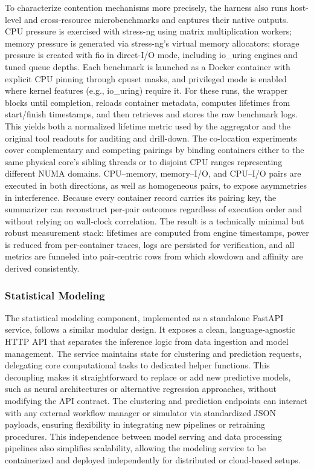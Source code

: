 To characterize contention mechanisms more precisely, the harness also runs host-level and cross-resource microbenchmarks and captures their native outputs. CPU pressure is exercised with stress-ng using matrix multiplication workers; memory pressure is generated via stress-ng’s virtual memory allocators; storage pressure is created with fio in direct-I/O mode, including io_uring engines and tuned queue depths. Each benchmark is launched as a Docker container with explicit CPU pinning through cpuset masks, and privileged mode is enabled where kernel features (e.g., io_uring) require it. For these runs, the wrapper blocks until completion, reloads container metadata, computes lifetimes from start/finish timestamps, and then retrieves and stores the raw benchmark logs. This yields both a normalized lifetime metric used by the aggregator and the original tool readouts for auditing and drill-down.
The co-location experiments cover complementary and competing pairings by binding containers either to the same physical core’s sibling threads or to disjoint CPU ranges representing different NUMA domains. CPU–memory, memory–I/O, and CPU–I/O pairs are executed in both directions, as well as homogeneous pairs, to expose asymmetries in interference. Because every container record carries its pairing key, the summarizer can reconstruct per-pair outcomes regardless of execution order and without relying on wall-clock correlation. The result is a technically minimal but robust measurement stack: lifetimes are computed from engine timestamps, power is reduced from per-container traces, logs are persisted for verification, and all metrics are funneled into pair-centric rows from which slowdown and affinity are derived consistently.

\subsubsection{Statistical Modeling}
\label{sec:statistical_modeling}
The statistical modeling component, implemented as a standalone FastAPI service, follows a similar modular design. It exposes a clean, language-agnostic HTTP API that separates the inference logic from data ingestion and model management. The service maintains state for clustering and prediction requests, delegating core computational tasks to dedicated helper functions. This decoupling makes it straightforward to replace or add new predictive models, such as neural architectures or alternative regression approaches, without modifying the API contract. The clustering and prediction endpoints can interact with any external workflow manager or simulator via standardized JSON payloads, ensuring flexibility in integrating new pipelines or retraining procedures. This independence between model serving and data processing pipelines also simplifies scalability, allowing the modeling service to be containerized and deployed independently for distributed or cloud-based setups.

